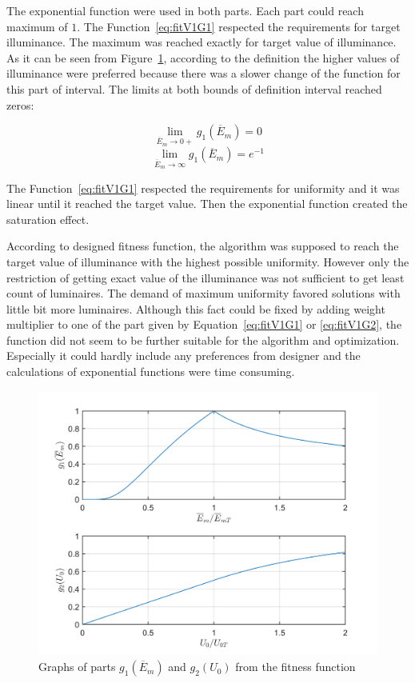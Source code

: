 The exponential function were used in both parts. Each part could reach maximum of $1$. The Function~\ref{eq:fitV1G1} respected the requirements for target illuminance. The maximum was reached exactly for target value of illuminance. As it can be seen from Figure~\ref{fig:fitV1G1G2}, according to the definition the higher values of illuminance were preferred because there was a slower change of the function for this part of interval. The limits at both bounds of definition interval reached zeros:

\begin{equation}
\label{eq:g1lim0}
\lim_{\overline{E}_{m}\to 0+} g_1\left(\overline{E}_{m}\right) = 0
\end{equation}
\begin{equation}
\label{eq:g1limInf}
\lim_{\overline{E}_{m}\to \infty} g_1\left(\overline{E}_{m}\right) = e^{-1}
\end{equation}

The Function~\ref{eq:fitV1G1} respected the requirements for uniformity and it was linear until it reached the target value. Then the exponential function created the saturation effect.

According to designed fitness function, the algorithm was supposed to reach the target value of illuminance with the highest possible uniformity. However only the restriction of getting exact value of the illuminance was not sufficient to get least count of luminaires. The demand of maximum uniformity favored solutions with little bit more luminaires. Although this fact could be fixed by adding weight multiplier to one of the part given by Equation~\ref{eq:fitV1G1} or \ref{eq:fitV1G2}, the function did not seem to be further suitable for the algorithm and optimization. Especially it could hardly include any preferences from designer and the calculations of exponential functions were time consuming.

\begin{figure}[htb]
  \centering
  \includegraphics[width=\columnwidth]{obrG1G2}
  \caption{Graphs of parts $g_1\left(\overline{E}_{m}\right)$ and $g_2\left(U_0\right)$ from the fitness function}
  \label{fig:fitV1G1G2}
\end{figure}

